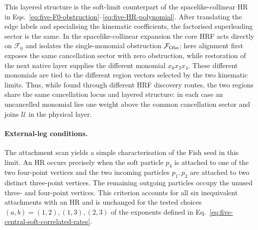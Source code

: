 \documentclass[a4paper,11pt]{article}
\newcommand{\FObs}{\mathcal F_{\rm Obs}}
\begin{document}
This layered structure is the soft-limit counterpart of the
spacelike-collinear HR in
Eqs.~\eqref{eq:five-F0-obstruction}--\eqref{eq:five-HR-polynomial}.  After
translating the edge labels and specialising the kinematic coefficients, the
factorised superleading sector is the same.  In the spacelike-collinear
expansion the core HRF acts directly on \(\mathcal F_0\) and isolates the
single-monomial obstruction \(\FObs\); here alignment first exposes the same
cancellation sector with zero obstruction, while restoration of the next
native layer supplies the different monomial \(x_0x_3x_4\).  These different
monomials are tied to the different region vectors selected by the two
kinematic limits.  Thus, while found through different HRF discovery routes, the two
regions share the same cancellation locus and layered structure: in each case
an uncancelled monomial lies one weight above the common cancellation sector
and joins \(\mathcal U\) in the physical layer.

\paragraph{External-leg conditions.}

The attachment scan yields a simple characterisation of the Fish seed in
this limit.  An HR occurs precisely when the soft particle \(p_4\) is
attached to one of the two four-point vertices and the two incoming particles
\(p_1,p_2\) are attached to two distinct three-point vertices.  The remaining
outgoing particles occupy the unused three- and four-point vertices.  This
criterion accounts for all six inequivalent attachments with an HR and is
unchanged for the tested choices \((a,b)=(1,2),(1,3),(2,3)\) of the
exponents defined in Eq.~\eqref{eq:five-central-soft-correlated-rates}.
\end{document}
